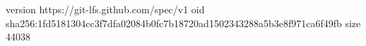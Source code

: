version https://git-lfs.github.com/spec/v1
oid sha256:1fd5181304cc3f7dfa02084b0fc7b18720ad1502343288a5b3e8f971ca6f49fb
size 44038
